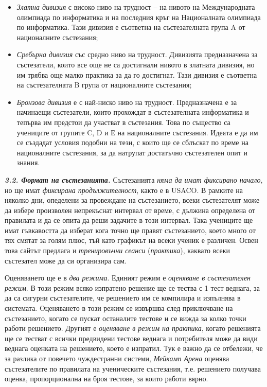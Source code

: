 \documentclass[11pt]{article}
\begin{document}
\begin{itemize}
\item
\textit{Златна дивизия} с високо ниво на трудност -- на нивото на
Международната олимпиада по информатика и на последния кръг на
Националната олимпиада по информатика. Тази дивизия е съответна на
състезателната група A от националните състезания;

\item
\textit{Сребърна дивизия} със средно ниво на трудност. Дивизията
предназначена за състезатели, които все още не са достигнали нивото
в златната дивизия, но им трябва още малко практика за да го
достигнат. Тази дивизия е съответна на състезателната B група
от националните състезания;

\item
\textit{Бронзова дивизия} е с най-ниско ниво на трудност.
Предназначена е за начинаещи състезатели, които  прохождат в
състезателната информатика и тепърва им предстои да участват в
състезания. Това по същество са учениците от групите C, D и Е на
националните състезания. Идеята е да им се създадат условия подобни
на тези, с които ще се сблъскат по време на националните състезания,
за да натрупат достатъчно състезателен опит и знания.

\end{itemize}

\textit{\textbf{3.2. Формат на състезанията.}} Състезанията
\textit{няма да имат фиксирано начало}, но ще имат \textit{фиксирана
продължителност}, както е в USACO. В рамките на няколко дни,
опеделени за провеждане на състезанието, всеки състезателят може да
избере произволен непрекъснат интервал от време, с дължина
определена от правилата и да се опита да реши задачите в този
интервал. Така учениците ще имат гъвкавостта да изберат кога точно
ще правят състезанието, което много от тях смятат за голям плюс, тъй
като графикът на всеки ученик е различен. Освен това сайтът предлага
и \textit{тренировъчни сеанси} (\textit{практика}), каквато всеки
състезател може да си организира сам.

Оценяването ще е в \textit{два режима}. Единият режим е
\textit{оценяване в състезателен режим}. В този режим всяко
изпратено решение ще се тества с 1 тест веднага, за да са сигурни
състезателите, че решението им се компилира и изпълнява в системата.
Oценяването в този режим се извършва след приключване на
състезанието, когато се пускат останалите тестове и се вижда за колко точки работи решението. Другият е \textit{оценяване в режим на практика},
когато решенията ще се тестват с всички предвидени тестове веднага и
потребителя може да види веднага оценката на решението, което е
изпратил. Тук е важно да се отбележи, че за разлика от повечето
чуждестранни системи, \textit{Мейкамп Арена} оценява състезателите
по правилата на ученическите състезания, т.е. решението получава
оценка, пропорционална на броя тестове, за които работи вярно.
\end{document}
